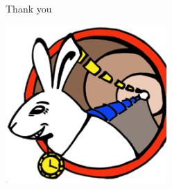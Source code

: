 \documentclass[compress,red]{beamer}
\begin{document}
\subsection{}
\begin{frame}{Thank you}


    
    \begin{center}
    \includegraphics[height=6.0cm]{../../figures/logo/WRlogo.ps}
    \end{center}

\end{frame}
\end{document}
